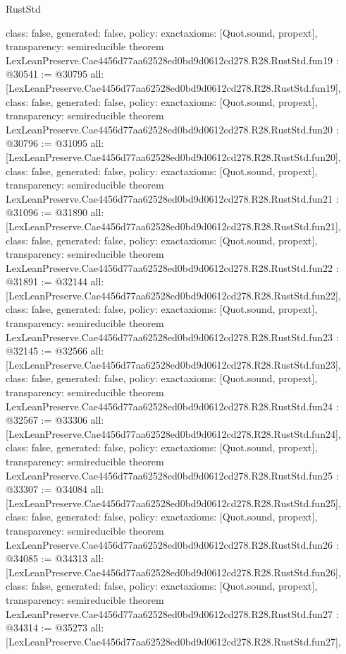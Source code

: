 \begin{lexlean}{RustStd}
\begin{coremodule}
{  class: false,
  generated: false,
  policy: exact{axioms: [Quot.sound, propext]},
  transparency: semireducible
}
theorem LexLeanPreserve.Cae4456d77aa62528ed0bd9d0612cd278.R28.RustStd.fun19 : @30541 := @30795 {
  all: [LexLeanPreserve.Cae4456d77aa62528ed0bd9d0612cd278.R28.RustStd.fun19],
  class: false,
  generated: false,
  policy: exact{axioms: [Quot.sound, propext]},
  transparency: semireducible
}
theorem LexLeanPreserve.Cae4456d77aa62528ed0bd9d0612cd278.R28.RustStd.fun20 : @30796 := @31095 {
  all: [LexLeanPreserve.Cae4456d77aa62528ed0bd9d0612cd278.R28.RustStd.fun20],
  class: false,
  generated: false,
  policy: exact{axioms: [Quot.sound, propext]},
  transparency: semireducible
}
theorem LexLeanPreserve.Cae4456d77aa62528ed0bd9d0612cd278.R28.RustStd.fun21 : @31096 := @31890 {
  all: [LexLeanPreserve.Cae4456d77aa62528ed0bd9d0612cd278.R28.RustStd.fun21],
  class: false,
  generated: false,
  policy: exact{axioms: [Quot.sound, propext]},
  transparency: semireducible
}
theorem LexLeanPreserve.Cae4456d77aa62528ed0bd9d0612cd278.R28.RustStd.fun22 : @31891 := @32144 {
  all: [LexLeanPreserve.Cae4456d77aa62528ed0bd9d0612cd278.R28.RustStd.fun22],
  class: false,
  generated: false,
  policy: exact{axioms: [Quot.sound, propext]},
  transparency: semireducible
}
theorem LexLeanPreserve.Cae4456d77aa62528ed0bd9d0612cd278.R28.RustStd.fun23 : @32145 := @32566 {
  all: [LexLeanPreserve.Cae4456d77aa62528ed0bd9d0612cd278.R28.RustStd.fun23],
  class: false,
  generated: false,
  policy: exact{axioms: [Quot.sound, propext]},
  transparency: semireducible
}
theorem LexLeanPreserve.Cae4456d77aa62528ed0bd9d0612cd278.R28.RustStd.fun24 : @32567 := @33306 {
  all: [LexLeanPreserve.Cae4456d77aa62528ed0bd9d0612cd278.R28.RustStd.fun24],
  class: false,
  generated: false,
  policy: exact{axioms: [Quot.sound, propext]},
  transparency: semireducible
}
theorem LexLeanPreserve.Cae4456d77aa62528ed0bd9d0612cd278.R28.RustStd.fun25 : @33307 := @34084 {
  all: [LexLeanPreserve.Cae4456d77aa62528ed0bd9d0612cd278.R28.RustStd.fun25],
  class: false,
  generated: false,
  policy: exact{axioms: [Quot.sound, propext]},
  transparency: semireducible
}
theorem LexLeanPreserve.Cae4456d77aa62528ed0bd9d0612cd278.R28.RustStd.fun26 : @34085 := @34313 {
  all: [LexLeanPreserve.Cae4456d77aa62528ed0bd9d0612cd278.R28.RustStd.fun26],
  class: false,
  generated: false,
  policy: exact{axioms: [Quot.sound, propext]},
  transparency: semireducible
}
theorem LexLeanPreserve.Cae4456d77aa62528ed0bd9d0612cd278.R28.RustStd.fun27 : @34314 := @35273 {
  all: [LexLeanPreserve.Cae4456d77aa62528ed0bd9d0612cd278.R28.RustStd.fun27],
}
\end{coremodule}
\end{lexlean}
